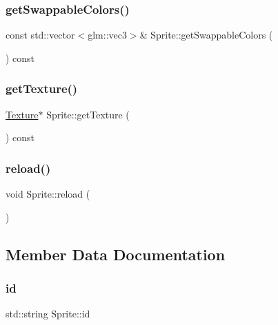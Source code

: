 \subsubsection{\texorpdfstring{get\+Swappable\+Colors()}{getSwappableColors()}}
{\footnotesize\ttfamily const std\+::vector$<$glm\+::vec3$>$\& Sprite\+::get\+Swappable\+Colors (\begin{DoxyParamCaption}{ }\end{DoxyParamCaption}) const\hspace{0.3cm}{\ttfamily [inline]}}

\mbox{\label{class_sprite_ad2c9622a0353ce1930e469d5fffce529}} 
\subsubsection{\texorpdfstring{get\+Texture()}{getTexture()}}
{\footnotesize\ttfamily \hyperlink{class_texture}{Texture}$\ast$ Sprite\+::get\+Texture (\begin{DoxyParamCaption}{ }\end{DoxyParamCaption}) const\hspace{0.3cm}{\ttfamily [inline]}}

\mbox{\label{class_sprite_a679597e8517454a28bcd3db3b281115d}} 
\subsubsection{\texorpdfstring{reload()}{reload()}}
{\footnotesize\ttfamily void Sprite\+::reload (\begin{DoxyParamCaption}{ }\end{DoxyParamCaption})}



\subsection{Member Data Documentation}
\mbox{\label{class_sprite_a83f441d0dc80c048e94d464a74eae396}} 
\subsubsection{\texorpdfstring{id}{id}}
{\footnotesize\ttfamily std\+::string Sprite\+::id\hspace{0.3cm}{\ttfamily [private]}}

